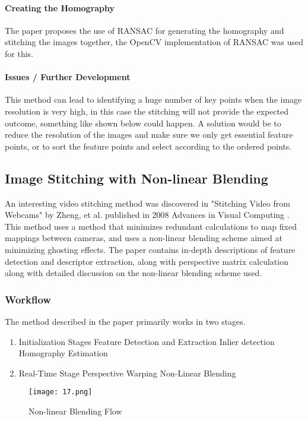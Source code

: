 \paragraph*{\textbf{Creating the Homography}}
The paper proposes the use of RANSAC for generating the homography and stitching the images together, the OpenCV implementation of RANSAC was used for this.

\paragraph*{\textbf{Issues / Further Development}}
This method can lead to identifying a huge number of key points when the image resolution is very high, in this case the stitching will not provide the expected outcome, something like shown below could happen. A solution would be to reduce the resolution of the images and make sure we only get essential feature points, or to sort the feature points and select according to the ordered points.

\subsection{Image Stitching with Non-linear Blending}
An interesting video stitching method was discovered in "Stitching Video from Webcams" by Zheng, et al. published in 2008 Advances in Visual Computing \cite{Zheng2008}. This method uses a method that minimizes redundant calculations to map fixed mappings between cameras, and uses a non-linear blending scheme aimed at minimizing ghosting effects. The paper contains in-depth descriptions of feature detection and descriptor extraction, along with perspective matrix calculation along with detailed discussion on the non-linear blending scheme used.

\subsubsection{Workflow}
The method described in the paper primarily works in two stages.
\begin{enumerate}
\item Initialization Stages
\subitem Feature Detection and Extraction
\subitem Inlier detection
\subitem Homography Estimation
\item Real-Time Stage
\subitem Perspective Warping
\subitem Non-Linear Blending
\end{enumerate}

\begin{figure}[htbp]
\sidecaption
\texttt{[image: 17.png]}
\caption{Non-linear Blending Flow}
\label{Fig_2_nlb_flow}       %
\end{figure}


